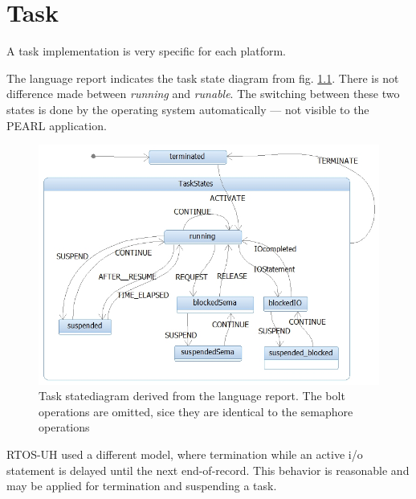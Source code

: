\chapter{Task}
\label{task}
A task implementation is very specific for each platform.

The language report indicates the task state diagram from 
fig. \ref{taskStatesPEARL90}. There is not difference made between {\em running} and {\em runable}. The switching between these two states is done by the
operating system automatically --- not visible to the PEARL application.

\begin{figure}[bpht]
\includegraphics[width=14cm]{taskStatesPEARL.jpg}
\caption{Task statediagram derived from the language report.
The bolt operations are omitted, sice they are identical to the
semaphore operations}
\label{taskStatesPEARL90}
\end{figure}


RTOS-UH used a different model, where termination while an active i/o statement
is delayed until the next end-of-record. 
This behavior is reasonable and may be applied for termination and
suspending a task. 

